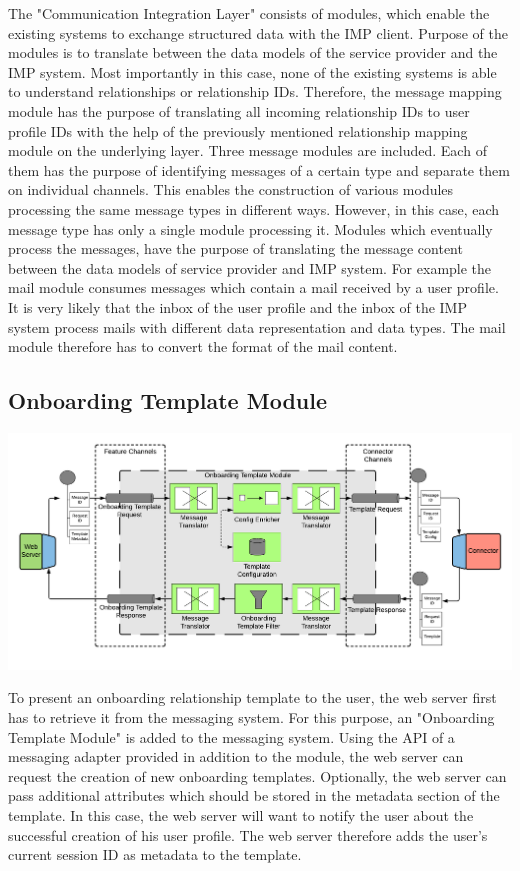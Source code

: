 The "Communication Integration Layer" consists of modules, which enable the existing systems to exchange structured data with the IMP client. Purpose of the modules is to translate between the data models of the service provider and the IMP system. Most importantly in this case, none of the existing systems is able to understand relationships or relationship IDs. Therefore, the message mapping module has the purpose of translating all incoming relationship IDs to user profile IDs with the help of the previously mentioned relationship mapping module on the underlying layer. Three message modules are included. Each of them has the purpose of identifying messages of a certain type and separate them on individual channels. This enables the construction of various modules processing the same message types in different ways. However, in this case, each message type has only a single module processing it. Modules which eventually process the messages, have the purpose of translating the message content between the data models of service provider and IMP system. For example the mail module consumes messages which contain a mail received by a user profile. It is very likely that the inbox of the user profile and the inbox of the IMP system process mails with different data representation and data types. The mail module therefore has to convert the format of the mail content.

\subsection{Onboarding Template Module}

\begin{center}
    \includegraphics[scale=0.6]{Diagrams/Integration Architecture 1/Technological Integration/6. Onboarding Template Module.pdf}
\end{center}

To present an onboarding relationship template to the user, the web server first has to retrieve it from the messaging system. For this purpose, an "Onboarding Template Module" is added to the messaging system. Using the API of a messaging adapter provided in addition to the module, the web server can request the creation of new onboarding templates. Optionally, the web server can pass additional attributes which should be stored in the metadata section of the template. In this case, the web server will want to notify the user about the successful creation of his user profile. The web server therefore adds the user's current session ID as metadata to the template.

